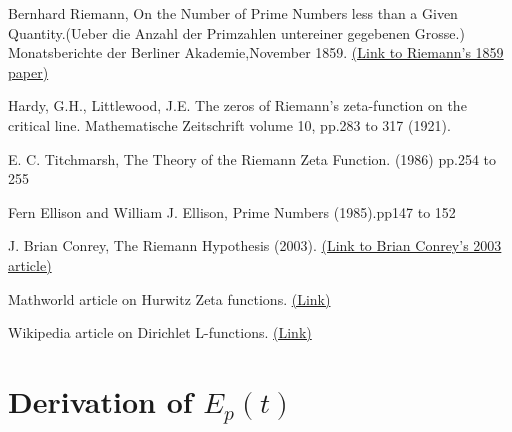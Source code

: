 \documentclass[11pt]{elsarticle}
\begin{document}






 
\begin{thebibliography}{15}

 Bernhard Riemann, On the Number of Prime Numbers less than a Given Quantity.(Ueber die Anzahl der Primzahlen untereiner gegebenen Grosse.) Monatsberichte der Berliner Akademie,November 1859. \href{https://www.claymath.org/sites/default/files/ezeta.pdf}{(Link to Riemann's 1859 paper)}


 Hardy, G.H., Littlewood, J.E. The zeros of Riemann's zeta-function on the critical line. Mathematische Zeitschrift volume  10, pp.283 to 317 (1921).
 
 E. C. Titchmarsh, The Theory of the Riemann Zeta Function. (1986) pp.254 to 255 

 Fern Ellison and William J. Ellison, Prime Numbers  (1985).pp147 to 152

  J. Brian Conrey, The Riemann Hypothesis  (2003). \href{https://www.ams.org/notices/200303/fea-conrey-web.pdf}{(Link to Brian Conrey's 2003 article)}

  Mathworld article on Hurwitz Zeta functions. \href{https://mathworld.wolfram.com/HurwitzZetaFunction.html}{(Link)}

  Wikipedia article on Dirichlet L-functions. \href{https://en.wikipedia.org/wiki/Dirichlet_L-function#Functional_equation}{(Link)}



\end{thebibliography}




\appendix\section{\label{sec:appendix_A} \textbf{Derivation of $E_p(t)$} \protect\\  \lowercase{} }
\end{document}
